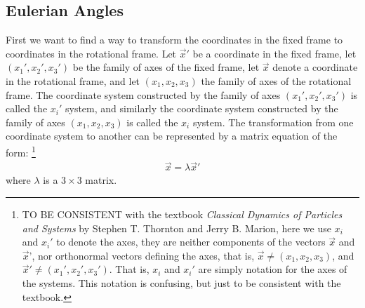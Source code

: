 \documentclass[11pt,oneside]{book}
\theoremstyle{break}
\theoremstyle{break}
\begin{document}
\subsection*{Eulerian Angles}
First we want to find a way to transform the coordinates in the fixed frame to coordinates in the rotational frame. Let $\vec{x}'$ be a coordinate in the fixed frame, let $(x_1', x_2', x_3')$ be the family of axes of the fixed frame, let $\vec{x}$ denote a coordinate in the rotational frame, and let $(x_1, x_2, x_3)$ the family of axes of the rotational frame. The coordinate system constructed by the family of axes $(x_1', x_2', x_3')$ is called the $x_i'$ system, and similarly the coordinate system constructed by the family of axes $(x_1, x_2, x_3)$ is called the $x_i$ system. The transformation from one coordinate system to another can be represented by a matrix equation of the form: \footnote{TO BE CONSISTENT with the textbook \textit{Classical Dynamics of Particles and Systems} by Stephen T. Thornton and Jerry B. Marion, here we use $x_i$ and $x_i'$ to denote the axes, they are neither components of the vectors $\vec{x}$ and $\vec{x}$', nor orthonormal vectors defining the axes, that is, $\vec{x} \neq (x_1,x_2,x_3)$, and $\vec{x}' \neq (x_1', x_2', x_3')$. That is, $x_i$ and $x_i'$ are simply notation for the axes of the systems. This notation is confusing, but just to be consistent with the textbook.}
\begin{align*}
\vec{x} = \lambda \vec{x}'
\end{align*}
where $\lambda$ is a $3\times 3$ matrix.\\
\end{document}

